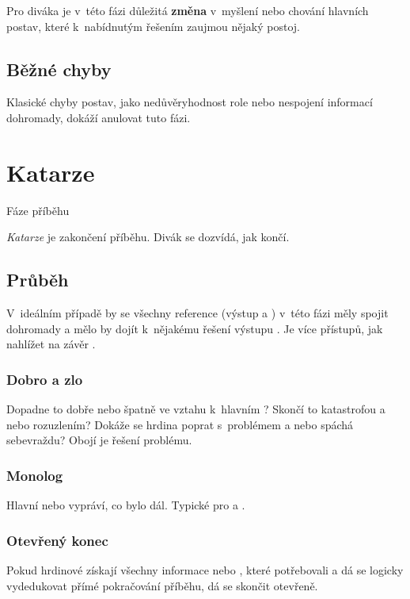 Pro diváka je v~této fázi důležitá \textbf{změna} v~myšlení nebo chování hlavních postav, které k~nabídnutým řešením zaujmou nějaký postoj. 
 
\subsection{ Běžné chyby }  
Klasické chyby postav, jako nedůvěryhodnost role nebo nespojení informací dohromady, dokáží anulovat tuto fázi. 
 
  
 
 
\needspace{5cm} \section{Katarze} \label{katarze} {{Fáze příběhu}} 
 
\textit{Katarze} je zakončení příběhu. Divák se dozvídá, jak  končí. 
 
\subsection{ Průběh }  
V~ideálním případě by se všechny  reference (výstup  a ) v~této fázi měly spojit dohromady a mělo by dojít k~nějakému řešení výstupu . Je více přístupů, jak nahlížet na závěr . 
 
\subsubsection{ Dobro a zlo } Dopadne to dobře nebo špatně ve vztahu k~hlavním ? Skončí to katastrofou a nebo rozuzlením? Dokáže se hrdina poprat s~problémem a nebo spáchá sebevraždu? Obojí je řešení problému. 
 
\subsubsection{ Monolog } Hlavní  nebo  vypráví, co bylo dál. Typické pro  a . 
 
\subsubsection{ Otevřený konec } Pokud hrdinové získají všechny informace nebo , které potřebovali a dá se logicky vydedukovat přímé pokračování příběhu, dá se skončit otevřeně. 
 
